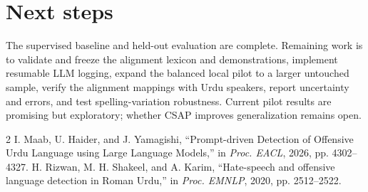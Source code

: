 \documentclass[conference]{IEEEtran}
\begin{document}
\section{Next steps}
The supervised baseline and held-out evaluation are complete. Remaining work is to validate and freeze the alignment lexicon and demonstrations, implement resumable LLM logging, expand the balanced local pilot to a larger untouched sample, verify the alignment mappings with Urdu speakers, report uncertainty and errors, and test spelling-variation robustness. Current pilot results are promising but exploratory; whether CSAP improves generalization remains open.
\begin{thebibliography}{2}
 I. Maab, U. Haider, and J. Yamagishi, ``Prompt-driven Detection of Offensive Urdu Language using Large Language Models,'' in \emph{Proc. EACL}, 2026, pp. 4302--4327.
 H. Rizwan, M. H. Shakeel, and A. Karim, ``Hate-speech and offensive language detection in Roman Urdu,'' in \emph{Proc. EMNLP}, 2020, pp. 2512--2522.
\end{thebibliography}
\end{document}
